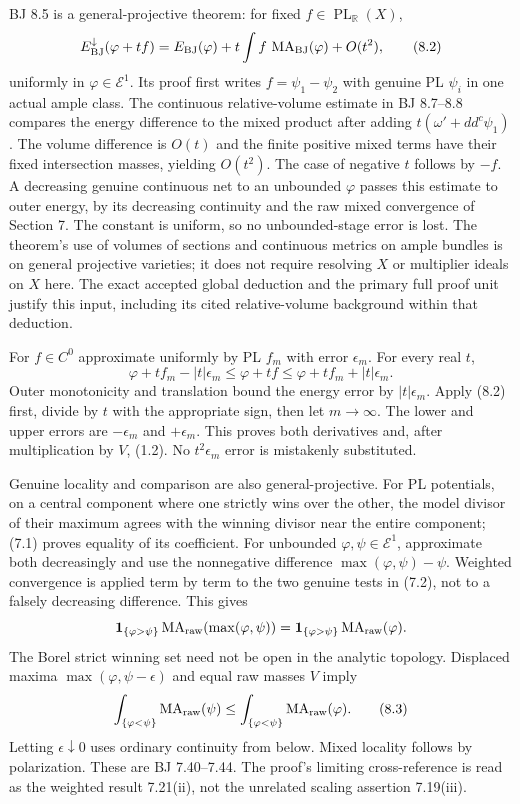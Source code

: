 \documentclass[
  10pt,
]{article}
\begin{document}
BJ 8.5 is a general-projective theorem: for fixed
\(f\in\operatorname{PL}_{\mathbb R}(X)\),
\[E_{\rm BJ}^{\downarrow}(\varphi+tf)
 =E_{\rm BJ}(\varphi)+t\int f\,\operatorname{MA}_{\rm BJ}(\varphi)+O(t^2), \tag{8.2}\]
uniformly in \(\varphi\in\mathcal E^1\). Its proof first writes
\(f=\psi_1-\psi_2\) with genuine PL \(\psi_i\) in one actual ample
class. The continuous relative-volume estimate in BJ 8.7--8.8 compares
the energy difference to the mixed product after adding
\(t(\omega'+dd^c\psi_1)\). The volume difference is \(O(t)\) and the
finite positive mixed terms have their fixed intersection masses,
yielding \(O(t^2)\). The case of negative \(t\) follows by \(-f\). A
decreasing genuine continuous net to an unbounded \(\varphi\) passes
this estimate to outer energy, by its decreasing continuity and the raw
mixed convergence of Section 7. The constant is uniform, so no
unbounded-stage error is lost. The theorem's use of volumes of sections
and continuous metrics on ample bundles is on general projective
varieties; it does not require resolving \(X\) or multiplier ideals on
\(X\) here. The exact accepted global deduction and the primary full
proof unit justify this input, including its cited relative-volume
background within that deduction.

For \(f\in C^0\) approximate uniformly by PL \(f_m\) with error
\(\epsilon_m\). For every real \(t\),
\[\varphi+tf_m-|t|\epsilon_m\le\varphi+tf\le\varphi+tf_m+|t|\epsilon_m.\]
Outer monotonicity and translation bound the energy error by
\(|t|\epsilon_m\). Apply (8.2) first, divide by \(t\) with the
appropriate sign, then let \(m\to\infty\). The lower and upper errors
are \(-\epsilon_m\) and \(+\epsilon_m\). This proves both derivatives
and, after multiplication by \(V\), (1.2). No \(t^2\epsilon_m\) error is
mistakenly substituted.

Genuine locality and comparison are also general-projective. For PL
potentials, on a central component where one strictly wins over the
other, the model divisor of their maximum agrees with the winning
divisor near the entire component; (7.1) proves equality of its
coefficient. For unbounded \(\varphi,\psi\in\mathcal E^1\), approximate
both decreasingly and use the nonnegative difference
\(\max(\varphi,\psi)-\psi\). Weighted convergence is applied term by
term to the two genuine tests in (7.2), not to a falsely decreasing
difference. This gives
\[\mathbf1_{\{\varphi>\psi\}}\operatorname{MA}_{\rm raw}(\max(\varphi,\psi))
 =\mathbf1_{\{\varphi>\psi\}}\operatorname{MA}_{\rm raw}(\varphi).\] The
Borel strict winning set need not be open in the analytic topology.
Displaced maxima \(\max(\varphi,\psi-\epsilon)\) and equal raw masses
\(V\) imply \[\int_{\{\varphi<\psi\}}\operatorname{MA}_{\rm raw}(\psi)
 \le\int_{\{\varphi<\psi\}}\operatorname{MA}_{\rm raw}(\varphi). \tag{8.3}\]
Letting \(\epsilon\downarrow0\) uses ordinary continuity from below.
Mixed locality follows by polarization. These are BJ 7.40--7.44. The
proof's limiting cross-reference is read as the weighted result
7.21(ii), not the unrelated scaling assertion 7.19(iii).
\end{document}
